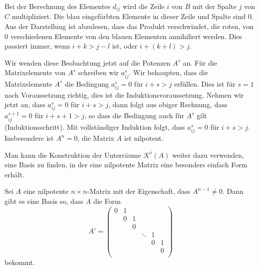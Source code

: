 \begin{beispiel}
\begin{center}
\end{center}
Bei der Berechnung des Elementes $d_{ij}$ wird die Zeile $i$ von $B$
mit der Spalte $j$ von $C$ multipliziert.
Die blau eingefärbten Elemente in dieser Zeile und Spalte sind $0$.
Aus der Darstellung ist abzulesen, dass das Produkt verschwindet, 
die roten, von $0$ verschiedenen Elemente von den blauen Elementen
annihiliert werden.
Dies passiert immer, wenn $i+k>j-l$ ist, oder $i+(k+l)> j$.

Wir wenden diese Beobachtung jetzt auf die Potenzen $A^s$ an.
Für die Matrixelemente von $A^s$ schreiben wir $a^s_{ij}$.
Wir behaupten, dass die Matrixelemente $A^s$ die Bedingung
$a_{ij}^s=0$ für $i+s>j$ erfüllen.
Dies ist für $s=1$ nach Voraussetzung richtig, dies ist die
Induktionsvoraussetzung.
Nehmen wir jetzt an, dass $a_{ij}^s=0$ für $i+s>j$, dann folgt
aus obiger Rechnung, dass $a_{ij}^{s+1}=0$ für $i+s+1>j$, so
dass die Bedingung auch für $A^s$ gilt (Induktionsschritt).
Mit vollständiger Induktion folgt, dass $a_{ij}^s=0$ für $i+s>j$.
Insbesondere ist $A^n=0$, die Matrix $A$ ist nilpotent.
\end{beispiel}

Man kann die Konstruktion der Unterräume $\mathcal{K}^i(A)$ weiter
dazu verwenden, eine Basis zu finden, in der eine nilpotente Matrix
eine besonders einfach Form erhält.

\begin{satz}
\label{buch:eigenwerte:satz:nnilpotent}
Sei $A$ eine nilpotente $n\times n$-Matrix mit der Eigenschaft, dass
$A^{n-1}\ne 0$.
Dann gibt es eine Basis so, dass $A$ die Form
\begin{equation}
A'
=
\begin{pmatrix}
0&1& &      & & \\
 &0&1&      & & \\
 & &0&      & & \\
 & & &\ddots&1& \\
 & & &      &0&1\\
 & & &      & &0\\
\end{pmatrix}
\label{buch:eigenwerte:eqn:nnilpotent}
\end{equation}
bekommt.
\end{satz}

